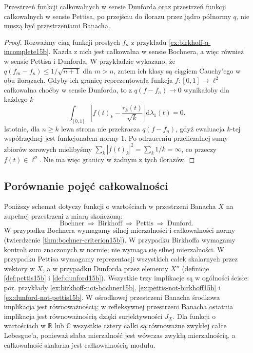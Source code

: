 \begin{wniosek}
\label{cor:weak-integrals-q-incomplete15b}
Przestrzeń funkcji całkowalnych w sensie Dunforda
oraz przestrzeń funkcji całkowalnych w sensie Pettisa,
po przejściu do ilorazu przez jądro półnormy $q$,
nie muszą być przestrzeniami Banacha.
\end{wniosek}
\begin{proof}
Rozważmy ciąg funkcji prostych $f_n$ z przykładu
\ref{ex:birkhoff-q-incomplete15b}. Każda z nich jest
całkowalna w sensie Bochnera, a więc również
w sensie Pettisa i Dunforda. W przykładzie wykazano,
że $q(f_m-f_n)\le1/\sqrt{n+1}$ dla $m>n$, zatem
ich klasy są ciągiem Cauchy'ego w obu ilorazach.
Gdyby ich granicę reprezentowała funkcja
$f:[0,1]\to\ell^2$ całkowalna choćby w sensie Dunforda,
to z $q(f-f_n)\to0$ wynikałoby dla każdego $k$
\[
 \int_{[0,1]}\left|f(t)_k-\frac{r_k(t)}{\sqrt{k}}\right|
 \,\mathrm d\lambda_1(t)=0.
\]
Istotnie, dla $n\ge k$ lewa strona nie przekracza
$q(f-f_n)$, gdyż ewaluacja $k$-tej współrzędnej
jest funkcjonałem normy $1$.
Po odrzuceniu przeliczalnej sumy zbiorów zerowych
mielibyśmy $\sum_k|f(t)_k|^2=\sum_k1/k=\infty$,
co przeczy $f(t)\in\ell^2$. Nie ma więc granicy
w żadnym z tych ilorazów.
\end{proof}

\subsection{Porównanie pojęć całkowalności}
Poniższy schemat dotyczy funkcji o wartościach w przestrzeni
Banacha $X$ na zupełnej przestrzeni z miarą skończoną:
\[
 \text{Bochner}\ \Longrightarrow\ \text{Birkhoff}\
 \Longrightarrow\ \text{Pettis}\ \Longrightarrow\ \text{Dunford}.
\]
W przypadku Bochnera wymagamy silnej mierzalności
i całkowalności normy (twierdzenie \ref{thm:bochner-criterion15b}).
W przypadku Birkhoffa wymagamy kontroli sum znaczonych
w normie; nie wymaga się silnej mierzalności.
W przypadku Pettisa wymagamy reprezentacji wszystkich
całek skalarnych przez wektory w $X$, a w przypadku
Dunforda przez elementy $X''$ (definicje
\ref{def:pettis15b} i \ref{def:dunford15b}).
Wszystkie trzy implikacje są w ogólności ścisłe:
por. przykłady \ref{ex:birkhoff-not-bochner15b},
\ref{ex:pettis-not-birkhoff15b}
i \ref{ex:dunford-not-pettis15b}.
W ośrodkowej przestrzeni Banacha środkowa implikacja
jest równoważnością; w refleksywnej przestrzeni Banacha
ostatnia implikacja jest równoważnością dzięki
surjektywności $J_X$.
Dla funkcji o wartościach w $\mathbb R$ lub $\mathbb C$
wszystkie cztery całki są równoważne zwykłej całce
Lebesgue'a, ponieważ słaba mierzalność jest wówczas
zwykłą mierzalnością, a całkowalność skalarna
jest całkowalnością modułu.


